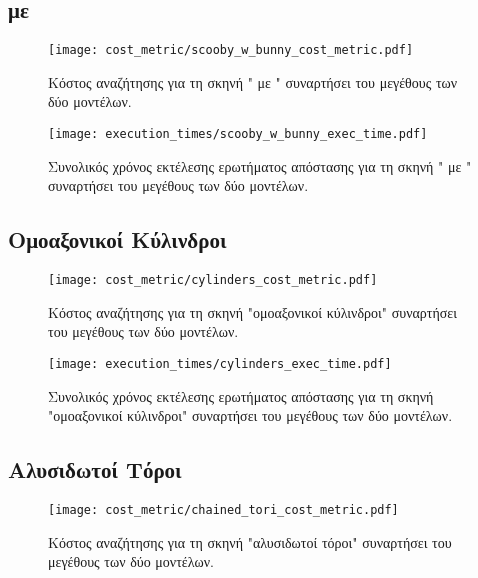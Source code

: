 \subsection{ με }
\begin{figure}[H]
    \centering
    \texttt{[image: cost\_metric/scooby\_w\_bunny\_cost\_metric.pdf]}
    \caption[Κόστος Αναζήτησης για " με "] {
        Κόστος αναζήτησης για τη σκηνή " με " συναρτήσει 
        του μεγέθους των δύο μοντέλων.
    }
\end{figure}

\begin{figure}[H]
    \centering
    \texttt{[image: execution\_times/scooby\_w\_bunny\_exec\_time.pdf]}
    \caption[Συνολικός Χρόνος Εκτέλεσης για " με "] {
        Συνολικός χρόνος εκτέλεσης ερωτήματος απόστασης 
        για τη σκηνή " με " συναρτήσει του μεγέθους των δύο μοντέλων.
    }
\end{figure}


\subsection{Ομοαξονικοί Κύλινδροι}
\begin{figure}[H]
    \centering
    \texttt{[image: cost\_metric/cylinders\_cost\_metric.pdf]}
    \caption[Κόστος Αναζήτησης για "ομοαξονικοί κύλινδροι"] {
        Κόστος αναζήτησης για τη σκηνή "ομοαξονικοί κύλινδροι" συναρτήσει 
        του μεγέθους των δύο μοντέλων.
    }
\end{figure}

\begin{figure}[H]
    \centering
    \texttt{[image: execution\_times/cylinders\_exec\_time.pdf]}
    \caption[Συνολικός Χρόνος Εκτέλεσης για "ομοαξονικοί κύλινδροι"] {
        Συνολικός χρόνος εκτέλεσης ερωτήματος απόστασης 
        για τη σκηνή "ομοαξονικοί κύλινδροι" συναρτήσει του μεγέθους των δύο μοντέλων.
    }
\end{figure}


\subsection{Αλυσιδωτοί Τόροι}
\begin{figure}[H]
    \centering
    \texttt{[image: cost\_metric/chained\_tori\_cost\_metric.pdf]}
    \caption[Κόστος Αναζήτησης για "αλυσιδωτοί τόροι"] {
        Κόστος αναζήτησης για τη σκηνή "αλυσιδωτοί τόροι" συναρτήσει 
        του μεγέθους των δύο μοντέλων.
    }
\end{figure}

